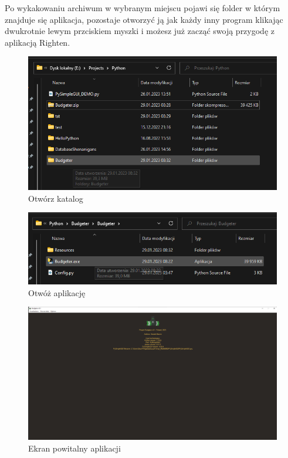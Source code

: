 \documentclass[a4paper,10pt, twoside]{report}
\begin{document}
{Po wykakowaniu archiwum w wybranym miejscu pojawi się folder w którym znajduje 
się aplikacja, pozostaje otworzyć ją jak każdy inny program klikając dwukrotnie 
lewym przciskiem myszki i możesz już zacząć swoją przygodę z aplikacją Righten.}

\begin{figure}[H]           %
    \caption{Otwórz katalog}
    \label{fig:Otwórz katalog}
    \centering
    \includegraphics[width=12cm]{figures/Guide/Righten_Instruction_02_open.png}
\end{figure}

\begin{figure}[H]           %
    \caption{Otwóż aplikację}
    \label{fig:Otwóż aplikację}
    \centering
    \includegraphics[width=12cm]{figures/Guide/Righten_Instruction_02_open_p2.png}
\end{figure}

\begin{figure}[H]           %
    \caption{Ekran powitalny aplikacji}
    \label{fig:Ekran powitalny aplikacji}
    \centering
    \includegraphics[width=12cm]{figures/Guide/Righten_Instruction_03_splashscreen.png}
\end{figure}
\end{document}
